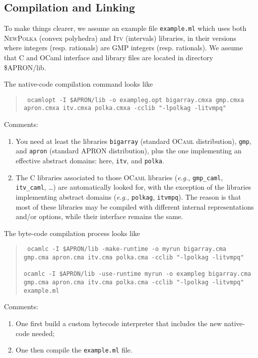 \documentclass[twoside,10pt,a4paper]{report}
\begin{document}
\subsection*{Compilation and Linking}

To make things clearer, we assume an example file
\texttt{example.ml} which uses both \textsc{NewPolka} (convex
polyhedra) and \textsc{Itv} (intervals) libraries, in their
versions where integers (resp. rationals) are GMP integers (resp.
rationals). We assume that C and OCaml interface and library files
are located in directory \$APRON/lib.

The native-code compilation command looks like
\begin{quote}\tt
  ocamlopt -I \$APRON/lib -o exampleg.opt bigarray.cmxa gmp.cmxa apron.cmxa itv.cmxa polka.cmxa -cclib "-lpolkag -litvmpq"
\end{quote}
Comments:
\begin{enumerate}
\item You need at least the libraries \texttt{bigarray} (standard
  \textsc{OCaml} distribution), \texttt{gmp}, and \texttt{apron}
  (standard APRON distribution), plus the one implementing an
  effective abstract domains: here, \texttt{itv}, and
  \texttt{polka}.
\item The C libraries associated to those \textsc{OCaml} libraries
  (\textit{e.g.,} \texttt{gmp\_caml}, \texttt{itv\_caml}, \ldots)
  are automatically looked for, with the exception of the
  libraries implementing abstract domains (\textit{e.g.,}
  \texttt{polkag}, \texttt{itvmpq}). The reason is that most of
  these libraries may be compiled with different internal
  representations and/or options, while their interface remains
  the same.
\end{enumerate}

The byte-code compilation process looks like
\begin{quote}\tt
  ocamlc -I \$APRON/lib -make-runtime -o myrun bigarray.cma gmp.cma apron.cma itv.cma polka.cma -cclib "-lpolkag -litvmpq" \\
  ~\\
  ocamlc -I \$APRON/lib -use-runtime myrun -o exampleg bigarray.cma gmp.cma apron.cma itv.cma polka.cma -cclib "-lpolkag -litvmpq" example.ml
\end{quote}
Comments:
\begin{enumerate}
\item One first build a custom bytecode interpreter that includes the new native-code needed;
\item One then compile the \texttt{example.ml} file.
\end{enumerate}
\end{document}

